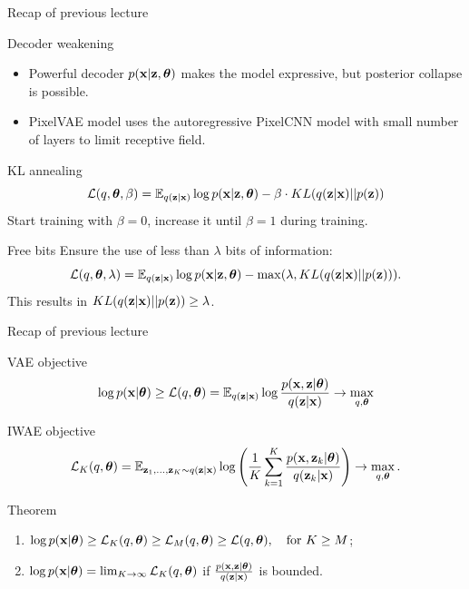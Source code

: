 \begin{frame}{Recap of previous lecture}
	\begin{block}{Decoder weakening}
		\begin{itemize}
			\item Powerful decoder $p(\mathbf{x} | \mathbf{z}, \boldsymbol{\theta})$ makes the model expressive, but posterior collapse is possible.
			\item PixelVAE model uses the autoregressive PixelCNN model with small number of layers to limit receptive field.
		\end{itemize}
	\end{block}
	
	\begin{block}{KL annealing}
		\vspace{-0.2cm}
		\[
		    \mathcal{L}(q, \boldsymbol{\theta}, \beta) = \mathbb{E}_{q(\mathbf{z} | \mathbf{x})} \log p(\mathbf{x} | \mathbf{z}, \boldsymbol{\theta}) - \beta \cdot KL (q(\mathbf{z} | \mathbf{x}) || p(\mathbf{z}))
		\]
		Start training with $\beta = 0$, increase it until $\beta = 1$ during training.
	\end{block}
	
	\begin{block}{Free bits}
		Ensure the use of less than $\lambda$ bits of information:
		\[
		    \mathcal{L}(q, \boldsymbol{\theta}, \lambda) = \mathbb{E}_{q(\mathbf{z} | \mathbf{x})} \log p(\mathbf{x} | \mathbf{z}, \boldsymbol{\theta}) - \max(\lambda, KL (q(\mathbf{z} | \mathbf{x}) || p(\mathbf{z}))).
		\]
		This results in $KL (q(\mathbf{z} | \mathbf{x}) || p(\mathbf{z})) \geq \lambda$.
	\end{block}
\end{frame}
\begin{frame}{Recap of previous lecture}
	\begin{block}{VAE objective}
		\vspace{-0.2cm}
		\[
		\log p(\mathbf{x} | \boldsymbol{\theta}) \geq \mathcal{L} (q, \boldsymbol{\theta})  = \mathbb{E}_{q(\mathbf{z} | \mathbf{x})} \log \frac{p(\mathbf{x}, \mathbf{z} | \boldsymbol{\theta})}{q(\mathbf{z}| \mathbf{x})} \rightarrow \max_{q, \boldsymbol{\theta}}
		\]
		\vspace{-0.2cm}
	\end{block}
	\begin{block}{IWAE objective}
		\vspace{-0.4cm}
		\[
		\mathcal{L}_K (q, \boldsymbol{\theta})  = \mathbb{E}_{\mathbf{z}_1, \dots, \mathbf{z}_K \sim q(\mathbf{z} | \mathbf{x})} \log \left( \frac{1}{K}\sum_{k=1}^K\frac{p(\mathbf{x}, \mathbf{z}_k | \boldsymbol{\theta})}{q(\mathbf{z}_k| \mathbf{x})} \right) \rightarrow \max_{q, \boldsymbol{\theta}}.
		\]
		\vspace{-0.4cm}
	\end{block}
	\begin{block}{Theorem}
		\begin{enumerate}
			\item $\log p(\mathbf{x} | \boldsymbol{\theta}) \geq \mathcal{L}_K (q, \boldsymbol{\theta}) \geq \mathcal{L}_M (q, \boldsymbol{\theta}) \geq \mathcal{L} (q, \boldsymbol{\theta}), \quad \text{for } K \geq M$;
			\item $\log p(\mathbf{x} | \boldsymbol{\theta}) = \lim_{K \rightarrow \infty} \mathcal{L}_K (q, \boldsymbol{\theta})$ if $\frac{p(\mathbf{x}, \mathbf{z} | \boldsymbol{\theta})}{q(\mathbf{z} | \mathbf{x})}$ is bounded.
		\end{enumerate}
	\end{block}
\end{frame}
